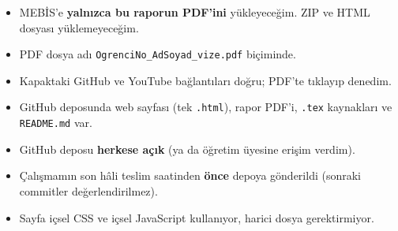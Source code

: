 \documentclass[12pt,a4paper]{article}
\begin{document}
\begin{itemize}
  \item[$\boxtimes$] MEBİS'e \textbf{yalnızca bu raporun PDF'ini} yükleyeceğim. ZIP ve HTML dosyası yüklemeyeceğim.
  \item[$\boxtimes$] PDF dosya adı \texttt{OgrenciNo\_AdSoyad\_vize.pdf} biçiminde.
  \item[$\boxtimes$] Kapaktaki GitHub ve YouTube bağlantıları doğru; PDF'te tıklayıp denedim.
  \item[$\boxtimes$] GitHub deposunda web sayfası (tek \texttt{.html}), rapor PDF'i, \texttt{.tex} kaynakları ve \texttt{README.md} var.
  \item[$\boxtimes$] GitHub deposu \textbf{herkese açık} (ya da öğretim üyesine erişim verdim).
  \item[$\boxtimes$] Çalışmamın son hâli teslim saatinden \textbf{önce} depoya gönderildi (sonraki commitler değerlendirilmez).
  \item[$\boxtimes$] Sayfa içsel CSS ve içsel JavaScript kullanıyor, harici dosya gerektirmiyor.
\end{itemize}
\end{document}
